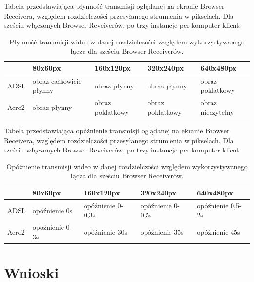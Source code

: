Tabela przedstawiająca płynność transmisji oglądanej na ekranie Browser Receivera, względem rozdzielczości przesyłanego strumienia w pikselach. Dla sześciu włączonych Browser Reveiverów, po trzy instancje per komputer klient:
\begin{table}[h]
    \centering
    \begin{tabular}{|l|l|l|l|l|}
        \hline
        & 80x60px & 160x120px & 320x240px & 640x480px \\
        \hline
        ADSL
        &
        obraz całkowicie płynny 
        &
        obraz płynny
        &
        obraz płynny
        &
        obraz poklatkowy
        \\
        \hline
        Aero2
        &
        obraz płynny
        &
        obraz poklatkowy
        &
        obraz poklatkowy
        &
        obraz nieczytelny
        \\
        \hline
    \end{tabular}
    \caption{Płynność transmisji wideo w danej rozdzielczości względem wykorzystywanego łącza dla sześciu Browser Receiverów.}
\end{table}

Tabela przedstawiająca opóźnienie transmisji oglądanej na ekranie Browser Receivera, względem rozdzielczości przesyłanego strumienia w pikselach. Dla sześciu włączonych Browser Reveiverów, po trzy instancje per komputer klient:
\begin{table}[h]
    \centering
    \begin{tabular}{|l|l|l|l|l|}
        \hline
        & 80x60px & 160x120px & 320x240px & 640x480px \\
        \hline
        ADSL
        &
        opóźnienie 0s
        &
        opóźnienie 0-0,3s
        &
        opóźnienie 0-0,5s
        &
        opóźnienie 0,5-2s \\
        \hline
        Aero2
        &
        opóźnienie 0-3s
        &
        opóźnienie 30s
        &
        opóźnienie 35s
        &
        opóźnienie 45s \\
        \hline
    \end{tabular}
    \caption{Opóźnienie transmisji wideo w danej rozdzielczości względem wykorzystywanego łącza dla sześciu Browser Receiverów.}
\end{table}

\newpage
\section{Wnioski}

